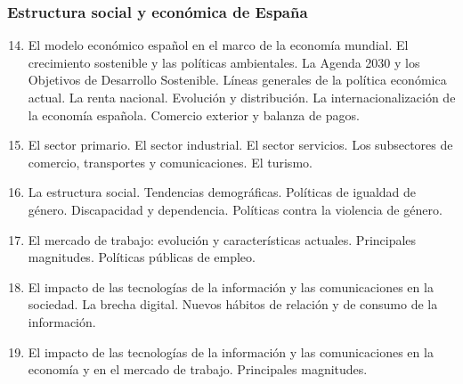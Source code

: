	\subsubsection{Estructura social y económica de España}
	\begin{enumerate}
		\setcounter{enumi}{13}
		\item El modelo económico español en el marco de la economía mundial. El crecimiento sostenible y las políticas ambientales. La Agenda 2030 y los Objetivos de Desarrollo Sostenible. Líneas generales de la política económica actual. La renta nacional. Evolución y distribución. La internacionalización  de la economía española. Comercio exterior y balanza de pagos.
		\item El sector primario. El sector industrial. El sector servicios. Los subsectores de comercio, transportes y comunicaciones. El turismo.
		\item La estructura social. Tendencias demográficas. Políticas de igualdad de género. Discapacidad y dependencia. Políticas contra la violencia de género.
		\item El mercado de trabajo: evolución y características actuales. Principales magnitudes. Políticas públicas de empleo.
		\item El impacto de las tecnologías de la información y las comunicaciones en la sociedad. La brecha digital. Nuevos hábitos de relación y de consumo de la información.
		\item El impacto de las tecnologías de la información y las comunicaciones en la economía y en el mercado de trabajo. Principales magnitudes.
	\end{enumerate}
